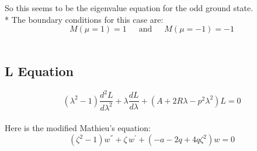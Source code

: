 \documentclass[11pt, oneside]{article}   	%
\begin{document}
So this seems to be the  eigenvalue equation for the odd ground state.\\*
The boundary conditions for this case are:
\begin{equation}
M(\mu=1)  = 1\,\,\,\,\,\,\,\text{ and  }\,\,\,\,\,\,\,M(\mu=-1)  = -1
\end{equation}\\[2.em]


\subsection*{L Equation}
\begin{equation}\label{L}
\left(\lambda^2 - 1 \right) \frac{d^2L}{ d\lambda^2 }+\lambda\frac{ dL }{d\lambda }  + \left(A + 2R\lambda - p^2\lambda^2  \right)L = 0  
\end{equation}\\[1.em]
Here is the modified Mathieu's equation:
\begin{equation}\label{LM}
\left(\zeta^2-1\right)w^{''} + \zeta\,w^{'} + \left(-a - 2q + 4q\zeta^2\right)w = 0 
\end{equation}
\end{document}
